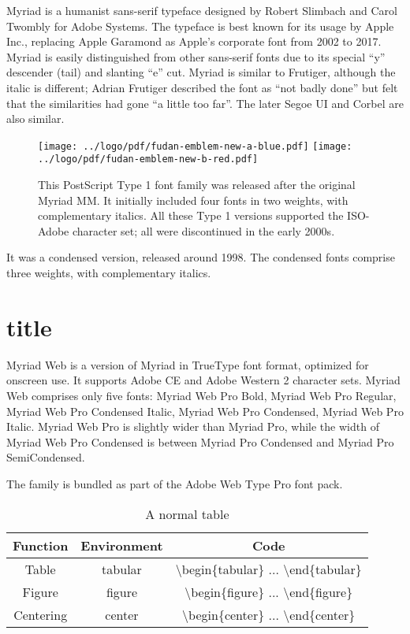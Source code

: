 \documentclass[twoside]{fduthesis-en}
\begin{document}
Myriad is a humanist sans-serif typeface designed by Robert Slimbach
and Carol Twombly for Adobe Systems. The typeface is best known for
its usage by Apple Inc., replacing Apple Garamond as Apple's corporate
font from 2002 to 2017. Myriad is easily distinguished from other
sans-serif fonts due to its special ``y'' descender (tail) and slanting
``e'' cut. Myriad is similar to Frutiger, although the italic is different;
Adrian Frutiger described the font as ``not badly done'' but felt that
the similarities had gone ``a little too far''. The later Segoe UI and
Corbel are also similar.

\begin{figure}[h]
  \centering
  \texttt{[image: ../logo/pdf/fudan-emblem-new-a-blue.pdf]}
  \texttt{[image: ../logo/pdf/fudan-emblem-new-b-red.pdf]}
  \caption{This PostScript Type 1 font family was released after the
    original Myriad MM. It initially included four fonts in two weights,
    with complementary italics. All these Type 1 versions supported
    the ISO-Adobe character set; all were discontinued in the early 2000s.}
\end{figure}

It was a condensed version, released around 1998. The condensed fonts
comprise three weights, with complementary italics.

\section{title}

Myriad Web is a version of Myriad in TrueType font format, optimized
for onscreen use. It supports Adobe CE and Adobe Western 2 character
sets. Myriad Web comprises only five fonts: Myriad Web Pro Bold, Myriad
Web Pro Regular, Myriad Web Pro Condensed Italic, Myriad Web Pro Condensed,
Myriad Web Pro Italic. Myriad Web Pro is slightly wider than Myriad Pro,
while the width of Myriad Web Pro Condensed is between Myriad Pro
Condensed and Myriad Pro SemiCondensed.

The family is bundled as part of the Adobe Web Type Pro font pack.

\begin{table}[h]
  \centering
  \caption{A normal table}
  \begin{tabular}{ccc}
    \hline
    \bfseries Function & \bfseries Environment & \bfseries Code \\
    \hline
    Table     & tabular & \ttfamily \backslash begin\{tabular\} ... \backslash end\{tabular\} \\
    Figure    & figure  & \ttfamily \backslash begin\{figure\}  ... \backslash end\{figure\}  \\
    Centering & center  & \ttfamily \backslash begin\{center\}  ... \backslash end\{center\}  \\
    \hline
  \end{tabular}
\end{table}
\end{document}
